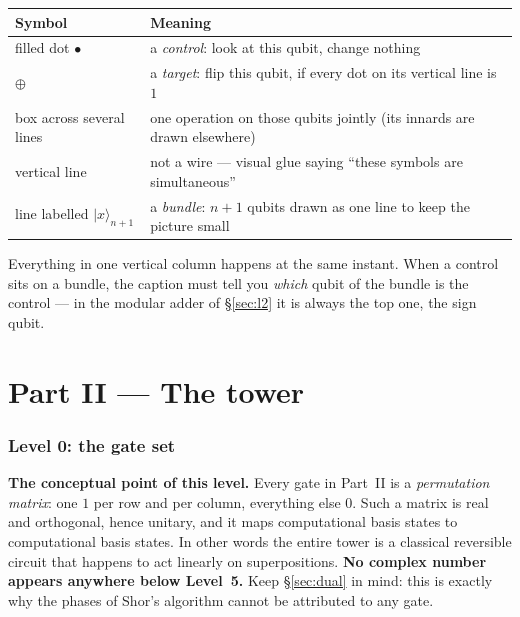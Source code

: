\documentclass[11pt]{article}
\renewcommand{\ket}[1]{\lvert #1 \rangle}
\theoremstyle{plain}
\theoremstyle{remark}
\begin{document}
\begin{center}
\begin{tabular}{@{}ll@{}}
\toprule
Symbol & Meaning\\
\midrule
filled dot $\bullet$ & a \emph{control}: look at this qubit, change nothing\\
$\oplus$ & a \emph{target}: flip this qubit, if every dot on its vertical line is $1$\\
box across several lines & one operation on those qubits jointly (its innards are drawn elsewhere)\\
vertical line & not a wire --- visual glue saying ``these symbols are simultaneous''\\
line labelled $\ket{x}_{n+1}$ & a \emph{bundle}: $n{+}1$ qubits drawn as one line to keep the picture small\\
\bottomrule
\end{tabular}
\end{center}

\noindent
Everything in one vertical column happens at the same instant. When a control sits on a bundle, the
caption must tell you \emph{which} qubit of the bundle is the control --- in the modular adder of
\S\ref{sec:l2} it is always the top one, the sign qubit.

\part*{Part II --- The tower}

\section{Level 0: the gate set}

\textbf{The conceptual point of this level.} Every gate in Part~II is a \emph{permutation matrix}:
one $1$ per row and per column, everything else $0$. Such a matrix is real and orthogonal, hence
unitary, and it maps computational basis states to computational basis states. In other words the
entire tower is a classical reversible circuit that happens to act linearly on superpositions.
\textbf{No complex number appears anywhere below Level~5.} Keep \S\ref{sec:dual} in mind: this is
exactly why the phases of Shor's algorithm cannot be attributed to any gate.
\end{document}
